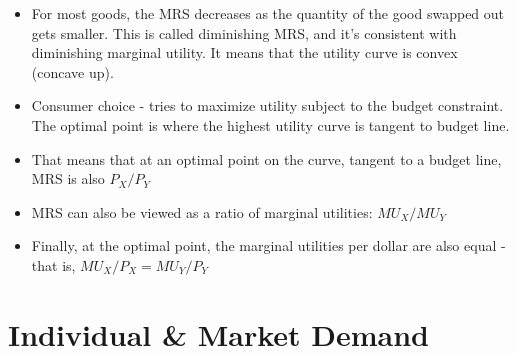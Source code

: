 \documentclass{exam}
\begin{document}
\begin{itemize}
\begin{itemize}
      \item From a calculus perspective, it's just $-dY/dX$.
    \end{itemize}
  \item For most goods, the MRS decreases as the quantity of the good swapped out gets smaller.  This
    is called diminishing MRS, and it's consistent with diminishing marginal utility.  It means that the utility
    curve is convex (concave up).
  \item Consumer choice - tries to maximize utility subject to the budget constraint.  The optimal point is where
    the highest utility curve is tangent to budget line.
  \item That means that at an optimal point on the curve, tangent to a budget line, MRS is also $P_X / P_Y$
  \item MRS can also be viewed as a ratio of marginal utilities:  $MU_X / MU_Y$
  \item Finally, at the optimal point, the marginal utilities per dollar are also equal - that is, $MU_X / P_X = MU_Y / P_Y$

\end{itemize}

\pagebreak
\section{Individual \& Market Demand}
\end{document}
